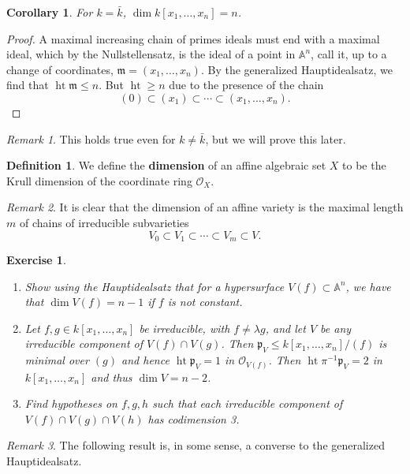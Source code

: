 \documentclass{article}
\newcommand{\fr}{\mathfrak}
\newcommand{\A}{\mathbb{A}}
\DeclareMathOperator{\hgt}{ht}
\theoremstyle{plain}
\newtheorem{cor}[thm]{Corollary}
\newtheorem{exc}{Exercise}
\theoremstyle{definition}
\newtheorem{defn}{Definition}
\theoremstyle{remark}
\newtheorem*{rem}{Remark}
\begin{document}
\begin{cor}
    For $k=\bar k$, $\dim k[x_1,\ldots,x_n]=n$.
\end{cor}
\begin{proof}
    A maximal increasing chain of primes ideals must end with a maximal ideal, which
    by the Nullstellensatz, is the ideal of a point in $\A^n$, call it, up to a change of
    coordinates, $\fr m=(x_1,\ldots,x_n)$. By the generalized Hauptidealsatz, we find that
    $\hgt\fr m\leq n$. But $\hgt\geq n$ due to the presence of the chain
    \[(0)\subset (x_1)\subset \cdots\subset (x_1,\ldots,x_n).\]
\end{proof}

\begin{rem}
    This holds true even for $k\neq\bar k$, but we will prove this later.
\end{rem}

\begin{defn}
    We define the \textbf{dimension} of an affine algebraic set $X$ to be the Krull dimension
    of the coordinate ring $\mathcal{O}_X$.
\end{defn}

\begin{rem}
    It is clear that the dimension of an affine variety is the maximal length $m$ of
    chains of irreducible subvarieties
    \[V_0\subset V_1\subset\cdots\subset V_m\subset V.\]
\end{rem}

\begin{exc}
    \begin{enumerate}
        \item Show using the Hauptidealsatz that for a hypersurface $V(f)\subset\A^n$,
            we have that $\dim V(f)=n-1$ if $f$ is not constant.
        \item Let $f,g\in k[x_1,\ldots,x_n]$ be irreducible, with $f\neq \lambda g$,
            and let $V$ be any irreducible component of $V(f)\cap V(g)$. Then
            $\fr p_V\leq k[x_1,\ldots,x_n]/(f)$ is minimal over $(g)$ and hence $\hgt\fr p_V=1$
            in $\mathcal{O}_{V(f)}$. Then $\hgt \pi^{-1}\fr p_V=2$ in $k[x_1,\ldots,x_n]$
            and thus $\dim V=n-2$.
        \item Find hypotheses on $f,g,h$ such that each irreducible component of $V(f)\cap V(g)\cap V(h)$
            has codimension 3.
    \end{enumerate}
\end{exc}

\begin{rem}
    The following result is, in some sense, a converse to the generalized Hauptidealsatz.
\end{rem}
\end{document}
